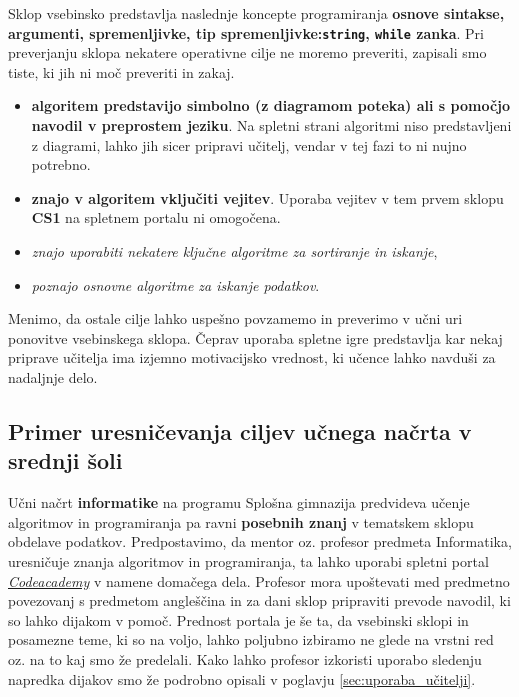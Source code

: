 Sklop vsebinsko predstavlja naslednje koncepte programiranja
\textbf{osnove sintakse, argumenti, spremenljivke, tip
  spremenljivke:\texttt{string}, \texttt{while} zanka}. Pri
preverjanju sklopa nekatere operativne cilje ne moremo preveriti,
zapisali smo tiste, ki jih ni moč preveriti in zakaj.

\begin{itemize}
\tightlist
\item \textbf{algoritem predstavijo simbolno (z diagramom poteka) ali s
  pomočjo navodil v preprostem jeziku}. Na spletni strani algoritmi
niso predstavljeni z diagrami, lahko jih sicer pripravi učitelj,
vendar v tej fazi to ni nujno potrebno. 
\item \textbf{znajo v algoritem vključiti vejitev}. Uporaba vejitev v
  tem prvem sklopu \textbf{CS1} na spletnem portalu ni omogočena.
\item \emph{znajo uporabiti nekatere ključne algoritme za sortiranje in
  iskanje},
\item \emph{poznajo osnovne algoritme za iskanje podatkov}.
\end{itemize}

Menimo, da ostale cilje lahko uspešno povzamemo in preverimo v učni
uri ponovitve vsebinskega sklopa. Čeprav uporaba spletne igre
predstavlja kar nekaj priprave učitelja ima izjemno motivacijsko
vrednost, ki učence lahko navduši za nadaljnje delo. 

\subsection{Primer uresničevanja ciljev učnega načrta v srednji šoli}
\label{sec:prim-uresn-cil-ss}

Učni načrt \textbf{informatike} na programu Splošna gimnazija
predvideva učenje algoritmov in programiranja pa ravni
\textbf{posebnih znanj} v tematskem sklopu obdelave
podatkov. Predpostavimo, da mentor oz. profesor predmeta Informatika,
uresničuje znanja algoritmov in programiranja, ta lahko uporabi
spletni portal \emph{\href{https://www.codecademy.com/}{Codeacademy}}
\cite{web:codeacademy} v namene domačega dela. Profesor mora
upoštevati med predmetno povezovanj s predmetom angleščina in za dani
sklop pripraviti prevode navodil, ki so lahko dijakom v
pomoč. Prednost portala je še ta, da vsebinski sklopi in posamezne
teme, ki so na voljo, lahko poljubno izbiramo ne glede na vrstni red
oz. na to kaj smo že predelali. Kako lahko profesor izkoristi uporabo
sledenju napredka dijakov smo že podrobno opisali v poglavju
\ref{sec:uporaba_učitelji}.

